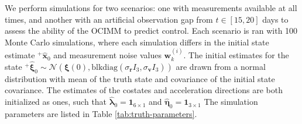 \documentclass[letterpaper, preprint, paper,11pt]{AAS}	%
\begin{document}
We perform simulations for two scenarios: one with measurements available at all times, and another with an artificial observation gap from $t \in [15, 20]$ days to assess the ability of the OCIMM to predict control. Each scenario is ran with 100 Monte Carlo simulations, where each simulation differs in the initial state estimate ${}^+\hat{\bm{x}}_0$ and measurement noise values $\bm{w}_k^{(i)}$. The initial estimates for the state ${}^+\hat{\bm{\xi}}_0 \sim \mathcal{N}(\bm{\xi}(0), \text{blkdiag}(\sigma_{\bm{r}}I_3, \sigma_{\bm{v}}I_3))$ are drawn from a normal distribution with mean of the truth state and covariance of the initial state covariance. The estimates of the costates and acceleration directions are both initialized as ones, such that $\hat{\bm{\lambda}}_0 = \bm{1}_{6 \times 1}$ and $\hat{\bm{\eta}}_0 = \bm{1}_{3\times1}$ The simulation parameters are listed in Table \ref{tab:truth-parameters}.
\end{document}
